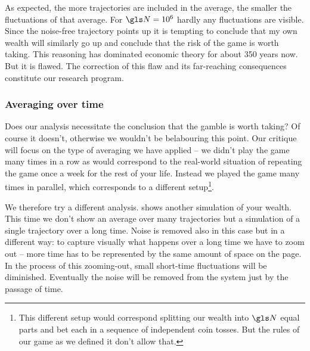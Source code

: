 \FloatBarrier
As expected, the more 
trajectories are included in the average, the smaller the fluctuations of 
that average. For $\N=10^6$ hardly any fluctuations are visible. Since the 
noise-free trajectory points up it is tempting to conclude that my own wealth will similarly go up and  conclude that the risk 
of the game is worth taking. This reasoning has dominated economic 
theory for about 350 years now. But it is flawed. The correction of this flaw and its far-reaching consequences constitute our research program.

\subsubsection{Averaging over time}
Does our analysis necessitate the conclusion that the gamble is worth taking? 
Of course it doesn't, otherwise we wouldn't be belabouring this point. 
 Our critique will focus on the type of averaging we have applied -- we didn't play the game many times
in a row as would correspond to the real-world situation of repeating the game once a week for the rest of your life. 
Instead we played the game many times in parallel, which corresponds to a different setup\footnote{This different setup would correspond splitting our wealth into $\N$ equal parts and bet each in a sequence of independent coin tosses. But the rules of our game as we defined it don't allow that.}.

We therefore try a different analysis.  shows another simulation of your wealth. This time we don't show an average over many trajectories but a simulation of a single trajectory
over a long time. Noise is removed also in this case but in a different way: to capture visually what 
happens over a long time we have to zoom out -- more time has to be represented by 
the same amount of space on the page. In the process of this zooming-out, small 
short-time fluctuations will be diminished. Eventually the noise will be removed from the system 
just by the passage of time.

